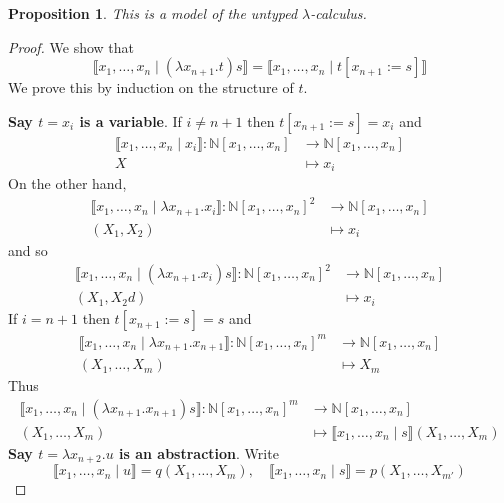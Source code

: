 \documentclass[12pt]{article}
\theoremstyle{plain}
\newtheorem{proposition}[thm]{Proposition}
\theoremstyle{definition}
\newcommand{\bb}[1]{\mathbb{#1}}
\newcommand{\lto}{\longrightarrow}
\begin{document}
\begin{proposition}
	This is a model of the untyped $\lambda$-calculus.
	\end{proposition}
\begin{proof}
	We show that
	\begin{equation}
		\llbracket x_1, \ldots, x_n \mid (\lambda x_{n+1}.t)s\rrbracket = \llbracket x_1, \ldots, x_n \mid t[x_{n+1} := s] \rrbracket
		\end{equation}
	We prove this by induction on the structure of $t$.
	
	\textbf{Say $t = x_i$ is a variable}. If $i \neq n+1$ then $t[x_{n+1} := s] = x_i$ and
	\begin{align*}
		\llbracket x_1, \ldots, x_n \mid x_i\rrbracket: \bb{N}[x_1, \ldots, x_n] &\lto \bb{N}[x_1, \ldots, x_n]\\
		X &\longmapsto x_i
		\end{align*}
	On the other hand,
	\begin{align*}
		\llbracket x_1, \ldots, x_n \mid \lambda x_{n+1}. x_i\rrbracket: \bb{N}[x_1, \ldots, x_n]^2 &\lto \bb{N}[x_1, \ldots, x_n]\\
		(X_1, X_2) &\longmapsto x_i
		\end{align*}
	and so
	\begin{align*}
		\llbracket x_1, \ldots, x_n \mid (\lambda x_{n+1}. x_i)s \rrbracket: \bb{N}[x_1, \ldots, x_n]^2 &\lto \bb{N}[x_1, \ldots, x_n]\\
		(X_1, X_2d) &\longmapsto x_i
		\end{align*}
	If $i = n+1$ then $t[x_{n+1} := s] = s$ and
	\begin{align*}
		\llbracket x_1, \ldots, x_n \mid \lambda x_{n+1}. x_{n+1} \rrbracket: \bb{N}[x_1, \ldots, x_n]^m &\lto \bb{N}[x_1, \ldots, x_n]\\
		(X_1, \ldots, X_m) &\longmapsto X_m
		\end{align*}
	Thus
	\begin{align*}
		\llbracket x_1, \ldots, x_n \mid (\lambda x_{n+1}.x_{n+1})s \rrbracket: \bb{N}[x_1, \ldots, x_n]^m &\lto \bb{N}[x_1, \ldots, x_n]\\
		(X_1, \ldots, X_m) &\longmapsto \llbracket x_1, \ldots, x_n \mid s\rrbracket(X_1, \ldots, X_m)
		\end{align*}
	\textbf{Say $t = \lambda x_{n+2}.u$ is an abstraction}. Write
	\begin{equation}
		\llbracket x_1, \ldots, x_n \mid u \rrbracket = q(X_1, \ldots, X_m),\quad \llbracket x_1, \ldots, x_n \mid s \rrbracket = p(X_1, \ldots, X_{m'})

\end{equation}
\end{proof}
\end{document}
